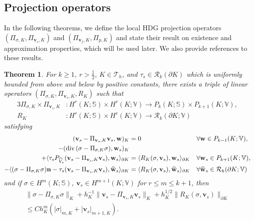\documentclass[10pt,letterpaper]{amsart}
\theoremstyle{plain} %
\newtheorem{theorem}{Theorem}[section] %
\theoremstyle{remark} %
\newcommand{\vect}[1]{\mathbf{#1}}
\newcommand{\divergence}{\mathrm{div}\,}
\begin{document}
\subsection{Projection operators}\label{ss:interpolation}
In the following theorems, we define the local HDG projection operators $(\Pi_{\sigma,K}, \Pi_{\vect{v}_{s},K})$ and $(\Pi_{\vect{v}_{f},K}, \Pi_{p,K})$ and state their result on existence and approximation properties, which will be used later. We also provide references to these results.
%
\begin{theorem}
	\label{thm:elasticity-interpolation}
	For $k\ge 1$, $r>\frac 12$, $K \in \mathcal{T}_h$, and  $\tau_{s} \in \mathcal{R}_k(\partial K)$ which is uniformly bounded from above and below by positive constants, there exists a triple of linear operators $(\Pi_{\sigma,K}, \Pi_{\vect{v}_s, K},R_K)$ such that
	\begin{alignat*}{3}
		\Pi_{\sigma,K} \times \Pi_{\vect{v}_s,K} &: H^r(K; \mathbb{S}) \times H^r(K; \mathbb{V}) \to {P}_k(K; \mathbb{S}) \times {P}_{k+1}(K;\mathbb{V}), 
		\\
		R_K &: H^r(K; \mathbb{S}) \times H^r(K; \mathbb{V}) \to \mathcal{R}_k(\partial K; \mathbb{V})
	\end{alignat*}
	satisfying
		\begin{align*}
			(\vect{v}_{s} - \Pi_{\vect{v}_{s},K} \vect{v}_{s} , \vect{w})_{K} &= 0 & & \forall \vect{w} \in {P}_{k-1}(K; \mathbb{V}), 
			\\
			-(\divergence (\sigma - \Pi_{\sigma,K} \sigma), \vect{w}_{s})_{K} &
            \\
            \notag 
            + \langle \tau_{s} {P_{\widehat{V}_s}} (\vect{v}_{s} - \Pi_{\vect{v}_{s},K} \vect{v}_{s}), \vect{w}_{s}\rangle_{\partial K} &= \langle R_K(\sigma, \vect{v}_{s}), \vect{w}_{s} \rangle_{\partial K} & & \forall \vect{w}_{s} \in {P}_{k+1}(K; \mathbb{V}), 
			\\
			-\langle (\sigma - \Pi_{\sigma,K} \sigma ) \vect{n} - \tau_{s}(\vect{v}_{s} - \Pi_{\vect{v}_{s},K}\vect{v}_{s} ), \widehat{\vect{w}}_{s} \rangle_{\partial K} &= \langle R_K(\sigma, \vect{v}_{s}), \widehat{\vect{w}}_{s} \rangle_{\partial K}  & & \forall \widehat{\vect{w}}_{s} \in \mathcal{R}_{k}(\partial K; \mathbb{V})
		\end{align*}
	and if $\sigma \in H^m(K; \mathbb{S})$, $\vect{v}_{s} \in H^{m+1}(K; \mathbb{V})$ for $r\le m \le k+1$, then 
	\begin{multline}	    
		\label{eq:elasticity-interpolation-estimate}
		\| \sigma - \Pi_{\sigma,K} \sigma\|_{K} + h_K^{-1}\| \vect{v}_{s} - \Pi_{\vect{v}_{s},K} \vect{v}_{s} \|_{K} + h_K^{1/2} \| R_K(\sigma, \vect{v}_s) \|_{\partial K}
        \\
        \le Ch_K^m (|\sigma|_{m, K} + |\vect{v}_{s}|_{m+1, K}) .
	\end{multline}
\end{theorem}
\end{document}
